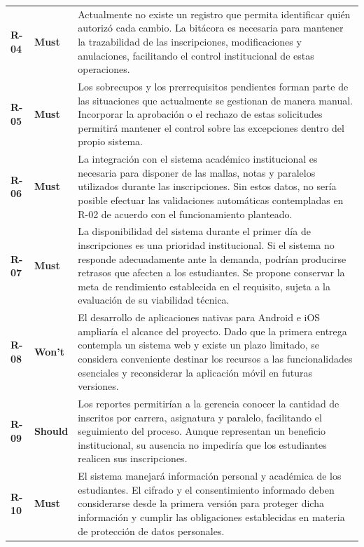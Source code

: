 \documentclass[12pt,a4paper]{article}
\begin{document}
\begin{longtable}{
    C{1.2cm}
    C{2.1cm}
    L{10.7cm}
}
\textbf{R-04} &
\textbf{Must} &
Actualmente no existe un registro que permita
identificar quién autorizó cada cambio. La bitácora
es necesaria para mantener la trazabilidad de las
inscripciones, modificaciones y anulaciones, facilitando
el control institucional de estas operaciones. \\

\textbf{R-05} &
\textbf{Must} &
Los sobrecupos y los prerrequisitos pendientes forman
parte de las situaciones que actualmente se gestionan
de manera manual. Incorporar la aprobación o el rechazo
de estas solicitudes permitirá mantener el control
sobre las excepciones dentro del propio sistema. \\

\textbf{R-06} &
\textbf{Must} &
La integración con el sistema académico institucional
es necesaria para disponer de las mallas, notas y
paralelos utilizados durante las inscripciones.
Sin estos datos, no sería posible efectuar las
validaciones automáticas contempladas en R-02
de acuerdo con el funcionamiento planteado. \\

\textbf{R-07} &
\textbf{Must} &
La disponibilidad del sistema durante el primer día
de inscripciones es una prioridad institucional.
Si el sistema no responde adecuadamente ante la
demanda, podrían producirse retrasos que afecten
a los estudiantes. Se propone conservar la meta
de rendimiento establecida en el requisito,
sujeta a la evaluación de su viabilidad técnica. \\

\textbf{R-08} &
\textbf{Won't} &
El desarrollo de aplicaciones nativas para Android
e iOS ampliaría el alcance del proyecto. Dado que
la primera entrega contempla un sistema web y existe
un plazo limitado, se considera conveniente destinar
los recursos a las funcionalidades esenciales y
reconsiderar la aplicación móvil en futuras versiones. \\

\textbf{R-09} &
\textbf{Should} &
Los reportes permitirían a la gerencia conocer la
cantidad de inscritos por carrera, asignatura y
paralelo, facilitando el seguimiento del proceso.
Aunque representan un beneficio institucional,
su ausencia no impediría que los estudiantes
realicen sus inscripciones. \\

\textbf{R-10} &
\textbf{Must} &
El sistema manejará información personal y académica
de los estudiantes. El cifrado y el consentimiento
informado deben considerarse desde la primera
versión para proteger dicha información y cumplir
las obligaciones establecidas en materia de
protección de datos personales. \\

\end{longtable}
\end{document}

